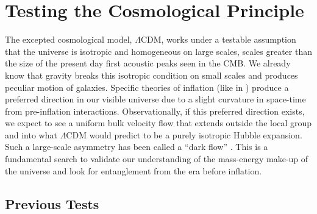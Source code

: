 \documentclass[apj, iop]{emulateapj}
\begin{document}
\section{Testing the Cosmological Principle}\label{testing-the-cosmological-principle}

The excepted cosmological model, $\Lambda$CDM, works under a testable assumption
that the universe is isotropic and homogeneous on large scales, scales greater
than the size of the present day first acoustic peaks seen in the CMB.
We already know that gravity breaks this isotropic condition on small scales and
produces peculiar motion of galaxies. Specific theories of inflation (like in
\cite{MersiniHoughton:2008io}) produce a preferred direction in our visible
universe due to a slight curvature in space-time from pre-inflation
interactions.  Observationally, if this preferred direction exists, we expect to
see a uniform bulk velocity flow that extends outside the local group and into
what $\Lambda$CDM would predict to be a purely isotropic Hubble expansion. Such
a large-scale asymmetry has been called a ``dark flow''
\citep{MersiniHoughton:2008io}. This is a fundamental search to validate our
understanding of the mass-energy make-up of the universe and look for
entanglement from the era before inflation.

\subsection{Previous Tests}\label{previous-tests}
\end{document}

